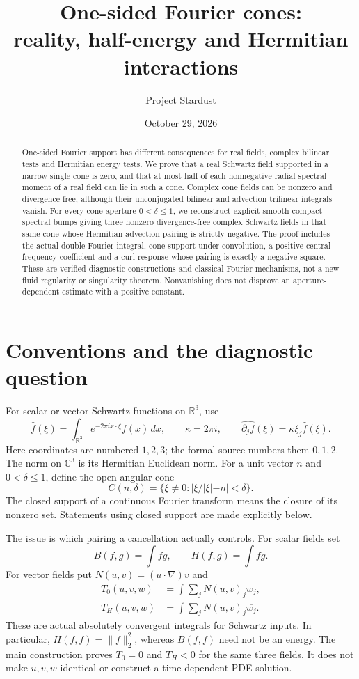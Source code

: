 \documentclass[11pt]{article}
\title{One-sided Fourier cones:\\reality, half-energy and Hermitian interactions}
\author{Project Stardust}\date{October 29, 2026}
\newcommand{\R}{\mathbb R}\newcommand{\C}{\mathbb C}
\begin{document}
\maketitle
\begin{abstract}
One-sided Fourier support has different consequences for real fields,
complex bilinear tests and Hermitian energy tests. We prove that a real
Schwartz field supported in a narrow single cone is zero, and that at most
half of each nonnegative radial spectral moment of a real field can lie in
such a cone. Complex cone fields can be nonzero and divergence free, although
their unconjugated bilinear and advection trilinear integrals vanish. For
every cone aperture $0<\delta\leq1$, we reconstruct explicit smooth compact
spectral bumps giving three nonzero divergence-free complex Schwartz fields
in that same cone whose Hermitian advection pairing is strictly negative.
The proof includes the actual double Fourier integral, cone support under
convolution, a positive central-frequency coefficient and a curl response
whose pairing is exactly a negative square. These are verified diagnostic
constructions and classical Fourier mechanisms, not a new fluid regularity
or singularity theorem. Nonvanishing does not disprove an aperture-dependent
estimate with a positive constant.
\end{abstract}

\section{Conventions and the diagnostic question}
For scalar or vector Schwartz functions on $\R^3$, use
\[
 \widehat f(\xi)=\int_{\R^3}e^{-2\pi i x\cdot\xi}f(x)\,dx,
 \qquad \kappa=2\pi i,
 \qquad\widehat{\partial_jf}(\xi)=\kappa\xi_j\widehat f(\xi).
\]
Here coordinates are numbered $1,2,3$; the formal source numbers them
$0,1,2$. The norm on $\C^3$ is its Hermitian Euclidean norm. For a unit
vector $n$ and $0<\delta\leq1$, define the open angular cone
\begin{equation}\label{eq:cone}
 C(n,\delta)=\{\xi\ne0:|\xi/|\xi|-n|<\delta\}.
\end{equation}
The closed support of a continuous Fourier transform means the closure of
its nonzero set. Statements using closed support are made explicitly below.

The issue is which pairing a cancellation actually controls. For scalar
fields set
\[
 B(f,g)=\int fg,\qquad H(f,g)=\int f\overline g.
\]
For vector fields put $N(u,v)=(u\cdot\nabla)v$ and
\begin{align*}
 T_0(u,v,w)&=\int\sum_jN(u,v)_j w_j,\\
 T_H(u,v,w)&=\int\sum_jN(u,v)_j\overline{w_j}.
\end{align*}
These are actual absolutely convergent integrals for Schwartz inputs. In
particular, $H(f,f)=\|f\|_2^2$, whereas $B(f,f)$ need not be an energy.
The main construction proves $T_0=0$ and $T_H<0$ for the same three fields.
It does not make $u,v,w$ identical or construct a time-dependent PDE solution.
\end{document}
